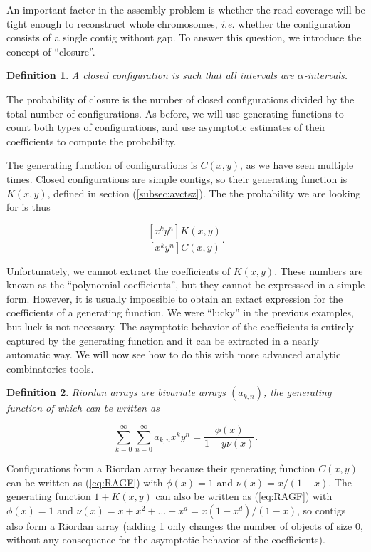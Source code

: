 \documentclass{article}
\newtheorem{definition}{Definition}
\begin{document}
An important factor in the assembly problem is whether the read coverage
will be tight enough to reconstruct whole chromosomes, \textit{i.e.}
whether the configuration consists of a single contig without gap. To
answer this question, we introduce the concept of ``closure''.

\begin{definition}
\label{def:closure}
A closed configuration is such that all intervals are $\alpha$-intervals.
\end{definition}

The probability of closure is the number of closed configurations divided
by the total number of configurations. As before, we will use generating
functions to count both types of configurations, and use asymptotic
estimates of their coefficients to compute the probability.

The generating function of configurations is $C(x,y)$, as we have seen
multiple times. Closed configurations are simple contigs, so their
generating function is $K(x,y)$, defined in section (\ref{subsec:avctsz}).
The the probability we are looking for is thus

\begin{equation*}
\frac{[x^ky^n]K(x,y)}{[x^ky^n]C(x,y)}.
\end{equation*}

Unfortunately, we cannot extract the coefficients of $K(x,y)$. These
numbers are known as the ``polynomial coefficients'', but they cannot be
expresssed in a simple form. However, it is usually impossible to obtain
an extact expression for the coefficients of a generating function. We
were ``lucky'' in the previous examples, but luck is not necessary.  The
asymptotic behavior of the coefficients is entirely captured by the
generating function and it can be extracted in a nearly automatic way. We
will now see how to do this with more advanced analytic combinatorics
tools.

\begin{definition}
Riordan arrays are bivariate arrays $(a_{k,n})$, the generating function
of which can be written as

\begin{equation}
\label{eq:RAGF}
\sum_{k=0}^\infty \sum_{n=0}^\infty a_{k,n} x^k y^n =
\frac{\phi(x)}{1-y \nu(x)}.
\end{equation}
\end{definition}

Configurations form a Riordan array because their generating
function $C(x,y)$ can be written as (\ref{eq:RAGF}) with $\phi(x) =
1$ and $\nu(x) = x/(1-x)$. The generating function $1+K(x,y)$ can also be
written as (\ref{eq:RAGF}) with $\phi(x) = 1$ and $\nu(x) =
x+x^2+\ldots+x^d = x(1-x^d)/(1-x)$, so contigs also form a Riordan array
(adding 1 only changes the number of objects of size 0, without any
consequence for the asymptotic behavior of the coefficients).
\end{document}
